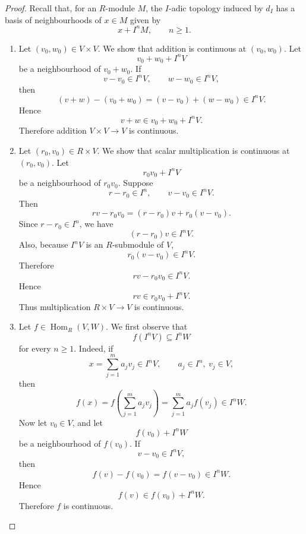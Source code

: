     \begin{proof}
    Recall that, for an \(R\)-module \(M\), the \(I\)-adic topology induced by
    \(d_I\) has a basis of neighbourhoods of \(x\in M\) given by
    \[
        x+I^nM,\qquad n\geq 1.
    \]
    
    \begin{enumerate}
        \item Let \((v_0,w_0)\in V\times V\). We show that addition is continuous at
              \((v_0,w_0)\). Let
              \[
                  v_0+w_0+I^nV
              \]
              be a neighbourhood of \(v_0+w_0\). If
              \[
                  v-v_0\in I^nV,\qquad w-w_0\in I^nV,
              \]
              then
              \[
                  (v+w)-(v_0+w_0)=(v-v_0)+(w-w_0)\in I^nV.
              \]
              Hence
              \[
                  v+w\in v_0+w_0+I^nV.
              \]
              Therefore addition \(V\times V\to V\) is continuous.
    
        \item Let \((r_0,v_0)\in R\times V\). We show that scalar multiplication is
              continuous at \((r_0,v_0)\). Let
              \[
                  r_0v_0+I^nV
              \]
              be a neighbourhood of \(r_0v_0\). Suppose
              \[
                  r-r_0\in I^n,\qquad v-v_0\in I^nV.
              \]
              Then
              \[
                  rv-r_0v_0=(r-r_0)v+r_0(v-v_0).
              \]
              Since \(r-r_0\in I^n\), we have
              \[
                  (r-r_0)v\in I^nV.
              \]
              Also, because \(I^nV\) is an \(R\)-submodule of \(V\),
              \[
                  r_0(v-v_0)\in I^nV.
              \]
              Therefore
              \[
                  rv-r_0v_0\in I^nV.
              \]
              Hence
              \[
                  rv\in r_0v_0+I^nV.
              \]
              Thus multiplication \(R\times V\to V\) is continuous.
    
        \item Let \(f\in \operatorname{Hom}_R(V,W)\). We first observe that
              \[
                  f(I^nV)\subseteq I^nW
              \]
              for every \(n\geq 1\). Indeed, if
              \[
                  x=\sum_{j=1}^m a_jv_j\in I^nV,
                  \qquad a_j\in I^n,\ v_j\in V,
              \]
              then
              \[
                  f(x)
                  =
                  f\left(\sum_{j=1}^m a_jv_j\right)
                  =
                  \sum_{j=1}^m a_jf(v_j)
                  \in I^nW.
              \]
              Now let \(v_0\in V\), and let
              \[
                  f(v_0)+I^nW
              \]
              be a neighbourhood of \(f(v_0)\). If
              \[
                  v-v_0\in I^nV,
              \]
              then
              \[
                  f(v)-f(v_0)=f(v-v_0)\in I^nW.
              \]
              Hence
              \[
                  f(v)\in f(v_0)+I^nW.
              \]
              Therefore \(f\) is continuous.
    \end{enumerate}
    \end{proof}
    

